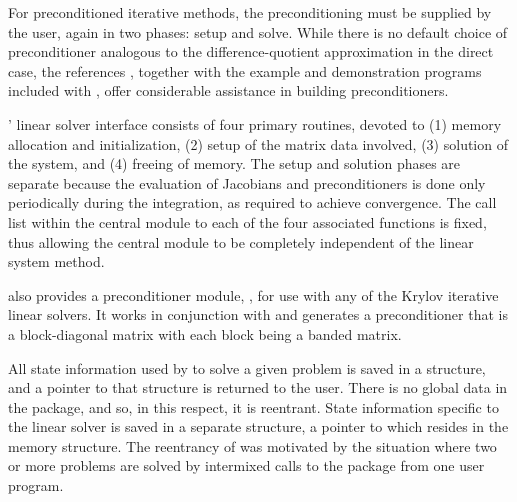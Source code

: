 For preconditioned iterative methods, 
the preconditioning must be supplied by the user, again in two phases:
setup and solve.  While there is no
default choice of preconditioner analogous to the difference-quotient
approximation in the direct case, the references
\cite{BrHi:89,Byr:92}, together with the example and demonstration
programs included with {\idas}, offer considerable assistance in
building preconditioners.

{\idas}' linear solver interface consists of four primary routines,
devoted to (1) memory allocation and initialization, (2) setup of the
matrix data involved, (3) solution of the system, and (4) freeing of memory.
The setup and solution phases are separate because the evaluation of
Jacobians and preconditioners is done only periodically during the
integration, as required to achieve convergence. The call list within
the central {\idas} module to each of the four associated functions is
fixed, thus allowing the central module to be completely independent
of the linear system method.

{\idas} also provides a preconditioner module, {\idabbdpre}, for use
with any of the Krylov iterative linear solvers.  It works in
conjunction with {\nvecp} and generates a preconditioner that is a
block-diagonal matrix with each block being a banded matrix.

All state information used by {\idas} to solve a given problem is saved
in a structure, and a pointer to that structure is returned to the
user.  There is no global data in the {\idas} package, and so, in this
respect, it is reentrant. State information specific to the linear
solver is saved in a separate structure, a pointer to which resides in
the {\idas} memory structure. The reentrancy of {\idas} was motivated
by the situation where two or more problems are solved by
intermixed calls to the package from one user program.
